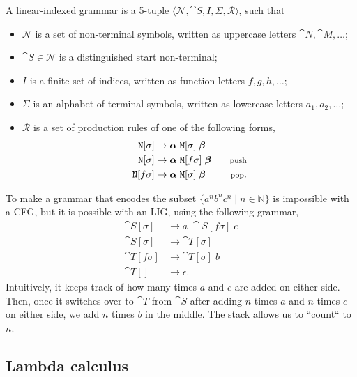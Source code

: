 \begin{definition}
  A linear-indexed grammar is a 5-tuple $\langle \mathcal{N}, \cat{S}, I,
  \Sigma, \mathcal{R} \rangle$, such that
  \begin{itemize}
    \item $\mathcal{N}$ is a set of non-terminal symbols, written as uppercase
      letters $\cat{N},\cat{M},\ldots$;
    \item $\cat{S}\in\mathcal{N}$ is a distinguished start non-terminal;
    \item $I$ is a finite set of indices, written as function letters
      $f,g,h,\ldots$;
    \item $\Sigma$ is an alphabet of terminal symbols, written as lowercase
      letters $a_1,a_2,\ldots$;
    \item $\mathcal{R}$ is a set of production rules of one of the following
      forms,
      \begin{align*}
        \cat{N}[\sigma] &\to \bm{\alpha} \; \cat{M}[\sigma] \; \bm{\beta} \\
        \cat{N}[\sigma] &\to \bm{\alpha} \; \cat{M}[f\sigma] \; \bm{\beta} & \text{\footnotesize push} \\
        \cat{N}[f\sigma] &\to \bm{\alpha} \; \cat{M}[\sigma] \; \bm{\beta} & \text{\footnotesize pop}
      .\end{align*}
  \end{itemize}
\end{definition}

To make a grammar that encodes the subset $\{ a^n b^n c^n \mid n\in\mathbb{N}
\}$ is impossible with a CFG, but it is possible with an LIG, using the
following grammar,
\begin{align*}
  \cat{S}[\sigma] &\to a \; \cat{S}[f\sigma] \; c \\
  \cat{S}[\sigma] &\to \cat{T}[\sigma] \\
  \cat{T}[f\sigma] &\to \cat{T}[\sigma] \; b \\
  \cat{T}[] &\to \epsilon
.\end{align*}
Intuitively, it keeps track of how many times $a$ and $c$ are added on either
side. Then, once it switches over to $\cat{T}$ from $\cat{S}$ after adding $n$
times $a$ and $n$ times $c$ on either side, we add $n$ times $b$ in the middle.
The stack allows us to ``count`` to $n$.

\subsection{Lambda calculus}

